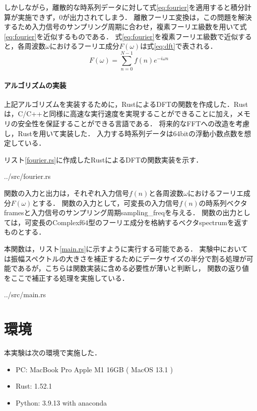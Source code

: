 \documentclass[dvipdfmx,titlepage,a4j]{jsarticle}  %
\begin{document}
しかしながら，離散的な時系列データに対して式\ref{eq:fourier}を適用すると積分計算が実施できず，0が出力されてしまう．
離散フーリエ変換は，この問題を解決するため入力信号のサンプリング周期に合わせ，複素フーリエ級数を用いて式\ref{eq:fourier}を近似するものである．
式\ref{eq:fourier}を複素フーリエ級数で近似すると，各周波数$\omega$におけるフーリエ成分$F(\omega)$は式\ref{eq:dft}で表される．
\begin{equation}
  F(\omega) = \sum_{n=0}^{N-1} f(n) e^{-i\omega n}
\label{eq:dft}
\end{equation}

\paragraph{アルゴリズムの実装\\}
上記アルゴリズムを実装するために，RustによるDFTの関数を作成した．Rustは，C/C++と同様に高速な実行速度を実現することができることに加え，メモリの安全性を保証することができる言語である．
将来的なFFTへの改造を考慮し，Rustを用いて実装した．
入力する時系列データは64bitの浮動小数点数を想定している．

リスト\ref{fourier.rs}に作成したRustによるDFTの関数実装を示す．


{../src/fourier.rs}

関数の入力と出力は，それぞれ入力信号$f(n)$と各周波数$\omega$におけるフーリエ成分$F(\omega)$とする．
関数の入力として，可変長の入力信号$f(n)$の時系列ベクタframesと入力信号のサンプリング周期sampling\_freqを与える．
関数の出力としては，可変長のComplexf64型のフーリエ成分を格納するベクタspectrumを返すものとする．


本関数は，リスト\ref{main.rs}に示すように実行する可能である．
実験中においては振幅スペクトルの大きさを補正するためにデータサイズの半分で割る処理が可能であるが，こちらは関数実装に含める必要性が薄いと判断し，
関数の返り値をここで補正する処理を実施している．


{../src/main.rs}

\section{環境}
本実験は次の環境で実施した．
\begin{itemize}
  \item PC: MacBook Pro Apple M1 16GB ( MacOS 13.1 )
  \item Rust: 1.52.1
  \item Python: 3.9.13 with anaconda
\end{itemize}
\end{document}
